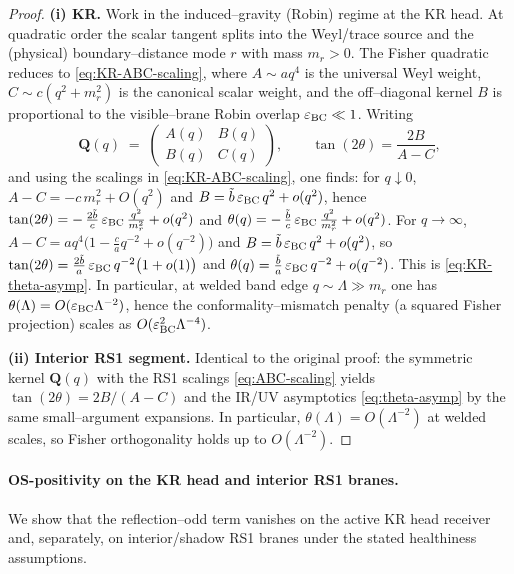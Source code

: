 \documentclass[10pt]{article}
\theoremstyle{definition}
\theoremstyle{plain}
\begin{document}
\begin{proof}
\textbf{(i) KR.}
Work in the induced–gravity (Robin) regime at the KR head. At quadratic order the scalar
tangent splits into the Weyl/trace source and the (physical) boundary–distance mode $r$ with mass $m_r>0$.
The Fisher quadratic reduces to \eqref{eq:KR-ABC-scaling}, where $A\sim a q^4$ is the universal Weyl weight,
$C\sim c(q^2+m_r^2)$ is the canonical scalar weight, and the off–diagonal kernel $B$ is proportional to the
visible–brane Robin overlap $\varepsilon_{\rm BC}\ll1$. Writing
\[
\mathbf Q(q)\;=\;\begin{pmatrix} A(q) & B(q) \\[2pt] B(q) & C(q) \end{pmatrix},\qquad
\tan(2\theta)=\frac{2B}{A-C},
\]
and using the scalings in \eqref{eq:KR-ABC-scaling}, one finds:
for $q\downarrow 0$,
$A-C=-c\,m_r^2+O(q^2)$ and $B=\tilde b\,\varepsilon_{\rm BC}\,q^2+o(q^2)$, hence
$\tan(2\theta)=-\,\tfrac{2\tilde b}{c}\,\varepsilon_{\rm BC}\,\tfrac{q^2}{m_r^2}+o(q^2)$ and
$\theta(q)=-\,\tfrac{\tilde b}{c}\,\varepsilon_{\rm BC}\,\tfrac{q^2}{m_r^2}+o(q^2)$.
For $q\to\infty$, $A-C=a q^4\big(1-\tfrac{c}{a}q^{-2}+o(q^{-2})\big)$ and $B=\tilde b\,\varepsilon_{\rm BC}\,q^2+o(q^2)$,
so $\tan(2\theta)=\tfrac{2\tilde b}{a}\,\varepsilon_{\rm BC}\,q^{-2}\big(1+o(1)\big)$ and
$\theta(q)=\tfrac{\tilde b}{a}\,\varepsilon_{\rm BC}\,q^{-2}+o(q^{-2})$. This is \eqref{eq:KR-theta-asymp}.
In particular, at welded band edge $q\sim \Lambda\gg m_r$ one has $\theta(\Lambda)=O(\varepsilon_{\rm BC}\Lambda^{-2})$,
hence the conformality–mismatch penalty (a squared Fisher projection) scales as
$O(\varepsilon_{\rm BC}^2\Lambda^{-4})$.

\medskip
\noindent
\textbf{(ii) Interior RS1 segment.}
Identical to the original proof: the symmetric kernel $\mathbf Q(q)$ with the RS1 scalings \eqref{eq:ABC-scaling}
yields $\tan(2\theta)=2B/(A-C)$ and the IR/UV asymptotics \eqref{eq:theta-asymp} by the same small–argument
expansions. In particular, $\theta(\Lambda)=O(\Lambda^{-2})$ at welded scales, so Fisher orthogonality holds
up to $O(\Lambda^{-2})$.
\end{proof}


\paragraph{OS-positivity on the KR head and interior RS1 branes.}\label{par:uom-main-053}
We show that the reflection--odd term vanishes on the active KR head receiver and, separately, on
interior/shadow RS1 branes under the stated healthiness assumptions.
\end{document}
